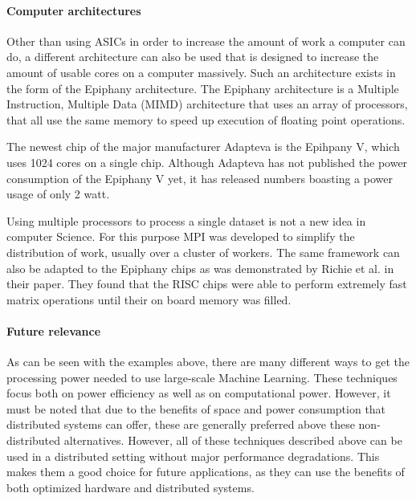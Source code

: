 \paragraph{Computer architectures}
Other than using ASICs in order to increase the amount of work a computer can do,
a different architecture can also be used that is designed to increase the amount
of usable cores on a computer massively. Such an architecture exists in the form
of the Epiphany architecture. The Epiphany architecture is a Multiple Instruction,
Multiple Data (MIMD) architecture that uses an array of processors, that all use the
same memory to speed up execution of floating point operations\cite{Olof16}.

The newest chip of the major manufacturer Adapteva is the Epihpany V, which uses
1024 cores on a single chip\cite{Olof16}. Although Adapteva has not published the power consumption of the Epiphany V yet,
it has released numbers boasting a power usage of only 2 watt\cite{Adap}.

Using multiple processors to process a single dataset is not a new idea in computer Science. For this purpose MPI was developed to simplify the distribution of work, usually over a cluster of workers. The same framework can also be adapted to the Epiphany chips as was demonstrated by Richie et al. in their paper. They found that the RISC chips were able to perform extremely fast matrix operations until their on board memory was filled\cite{Rich15}.

\paragraph{Future relevance}
As can be seen with the examples above, there are many different ways to get the processing
power needed to use large-scale Machine Learning. These techniques focus both on
power efficiency as well as on computational power. However, it must be noted
that due to the benefits of space and power consumption that distributed systems can offer,
these are generally preferred above these non-distributed alternatives. However, all of these
techniques described above can be used in a distributed setting without major performance degradations.
This makes them a good choice for future applications, as they can use the benefits of both optimized hardware and distributed systems.
